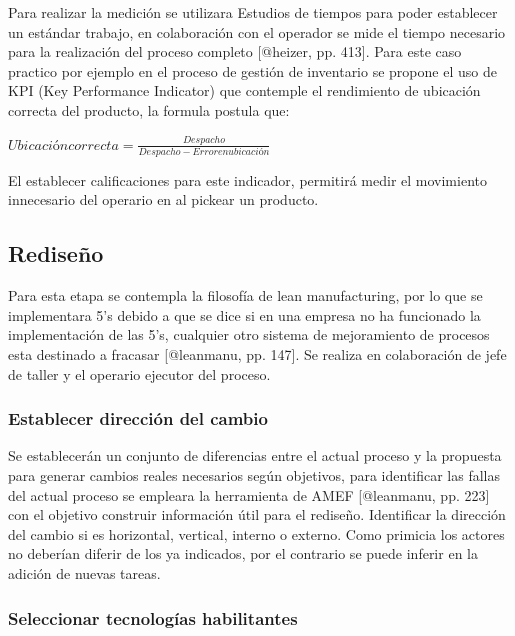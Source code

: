 \documentclass[11pt]{article}
\begin{document}
Para realizar la medición se utilizara Estudios de tiempos para poder
establecer un estándar trabajo, en colaboración con el operador se mide
el tiempo necesario para la realización del proceso completo {[}@heizer,
pp. 413{]}. Para este caso practico por ejemplo en el proceso de gestión
de inventario se propone el uso de KPI (Key Performance Indicator) que
contemple el rendimiento de ubicación correcta del producto, la formula
postula que:

\begin{center}
$Ubicacióncorrecta = \frac{Despacho}{Despacho-Error en ubicación}$
\end{center}

El establecer calificaciones para este indicador, permitirá medir el
movimiento innecesario del operario en al pickear un producto.

\hypertarget{rediseuxf1o}{%
\subsection{Rediseño}\label{rediseuxf1o}}

Para esta etapa se contempla la filosofía de lean manufacturing, por lo
que se implementara 5's debido a que se dice si en una empresa no ha
funcionado la implementación de las 5's, cualquier otro sistema de
mejoramiento de procesos esta destinado a fracasar {[}@leanmanu, pp.
147{]}. Se realiza en colaboración de jefe de taller y el operario
ejecutor del proceso.

\hypertarget{establecer-direcciuxf3n-del-cambio}{%
\subsubsection{Establecer dirección del
cambio}\label{establecer-direcciuxf3n-del-cambio}}

Se establecerán un conjunto de diferencias entre el actual proceso y la
propuesta para generar cambios reales necesarios según objetivos, para
identificar las fallas del actual proceso se empleara la herramienta de
AMEF {[}@leanmanu, pp. 223{]} con el objetivo construir información útil
para el rediseño. Identificar la dirección del cambio si es horizontal,
vertical, interno o externo. Como primicia los actores no deberían
diferir de los ya indicados, por el contrario se puede inferir en la
adición de nuevas tareas.

\hypertarget{seleccionar-tecnologuxedas-habilitantes}{%
\subsubsection{Seleccionar tecnologías
habilitantes}\label{seleccionar-tecnologuxedas-habilitantes}}
\end{document}
